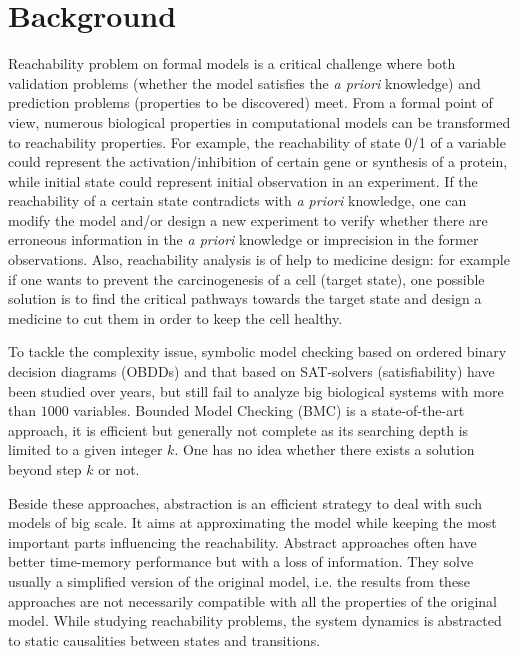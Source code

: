 \section{Background}
Reachability problem on formal models is a critical challenge where both validation problems (whether the model satisfies the \textit{a priori} knowledge) and prediction problems (properties to be discovered) meet. 
From a formal point of view, numerous biological properties in computational models can be transformed to reachability properties. 
For example, the reachability of state 0/1 of a variable could represent the activation/inhibition of certain gene or synthesis of a protein, while initial state could represent initial observation in an experiment.
If the reachability of a certain state contradicts with \textit{a priori} knowledge, one can modify the model and/or design a new experiment to verify whether there are erroneous information in the \textit{a priori} knowledge or imprecision in the former observations.
Also, reachability analysis is of help to medicine design: for example if one wants to prevent the carcinogenesis of a cell (target state), one possible solution is to find the critical pathways towards the target state and design a medicine to cut them in order to keep the cell healthy.

To tackle the complexity issue, symbolic model checking \cite{burch1992symbolic} based on ordered binary decision diagrams (OBDDs) \cite{hardin1997new} and that based on SAT-solvers (satisfiability) \cite{abdulla2000symbolic} have been studied over years, but still fail to analyze big biological systems with more than $1000$ variables. 
Bounded Model Checking (BMC) \cite{clarke2001bounded} is a state-of-the-art approach, it is efficient but generally not complete as its searching depth is limited to a given integer $k$.
One has no idea whether there exists a solution beyond step $k$ or not.

Beside these approaches, abstraction is an efficient strategy to deal with such models of big scale. 
It aims at approximating the model while keeping the most important parts influencing the reachability.
Abstract approaches often have better time-memory performance but with a loss of information. 
They solve usually a simplified version of the original model, i.e. the results from these approaches are not necessarily compatible with all the properties of the original model.
While studying reachability problems, the system dynamics is abstracted to static causalities between states and transitions.

